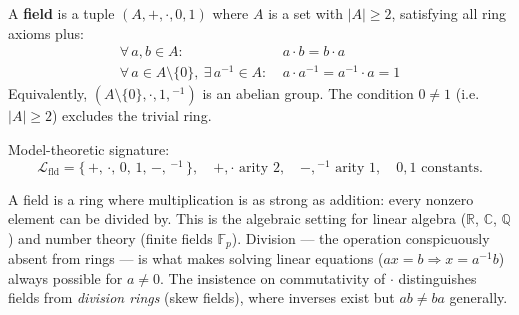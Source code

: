 \begin{definition}[Field]
\label{def:formal-model-theoretic-structures-l704}
  A \textbf{field} is a tuple $(A, +, \cdot, 0, 1)$ where $A$ is a set with
  $|A| \geq 2$, satisfying all ring axioms plus:
  \begin{align*}
    \forall\,a,b \in A:\ & a \cdot b = b \cdot a \tag{Commutativity of $\cdot$}\\
    \forall\,a \in A\setminus\{0\},\ \exists\,a^{-1} \in A:\ &
      a \cdot a^{-1} = a^{-1} \cdot a = 1 \tag{Multiplicative Inverses}
  \end{align*}
  Equivalently, $(A\setminus\{0\}, \cdot, 1, {}^{-1})$ is an abelian group.
  The condition $0 \ne 1$ (i.e.\ $|A|\ge 2$) excludes the trivial ring.

  \medskip\noindent
  Model-theoretic signature:
  \[
    \mathcal{L}_{\mathrm{fld}} = \{\,+,\,\cdot,\,0,\,1,\,-,\,{}^{-1}\,\},
    \quad +,\cdot \text{ arity } 2,\quad -,{}^{-1} \text{ arity } 1,\quad
    0,1 \text{ constants.}
  \]
\end{definition}

\begin{remark}
  A field is a ring where multiplication is as strong as addition: every nonzero
  element can be divided by.  This is the algebraic setting for linear algebra
  ($\mathbb{R}$, $\mathbb{C}$, $\mathbb{Q}$) and number theory (finite fields
  $\mathbb{F}_p$).  Division --- the operation conspicuously absent from rings ---
  is what makes solving linear equations ($ax = b \Rightarrow x = a^{-1}b$)
  always possible for $a \ne 0$.  The insistence on commutativity of $\cdot$
  distinguishes fields from \emph{division rings} (skew fields), where inverses
  exist but $ab \ne ba$ generally.
\end{remark}



\clearpage\thispagestyle{plain}

